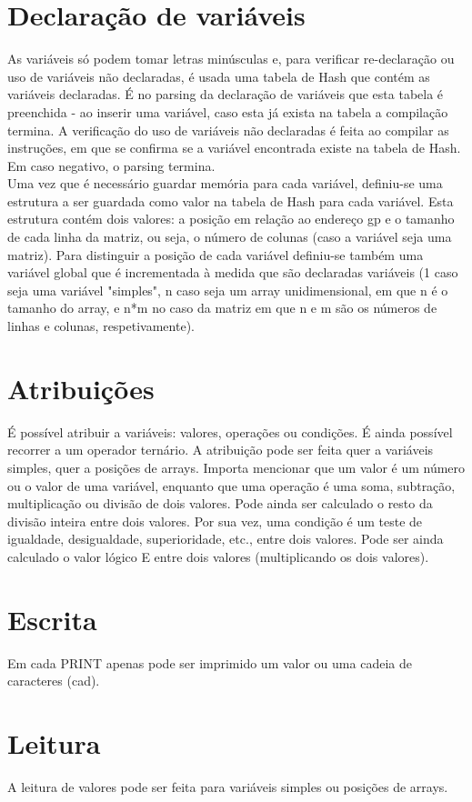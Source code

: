 \documentclass{report}
\begin{document}
\section{Declaração de variáveis}
As variáveis só podem tomar letras minúsculas e, para verificar re-declaração ou uso de variáveis não declaradas, é usada uma tabela de Hash que contém as variáveis declaradas. É no parsing da declaração de variáveis que esta tabela é preenchida - ao inserir uma variável, caso esta já exista na tabela a compilação termina. A verificação do uso de variáveis não declaradas é feita ao compilar as instruções, em que se confirma se a variável encontrada existe na tabela de Hash. Em caso negativo, o parsing termina.\\
Uma vez que é necessário guardar memória para cada variável, definiu-se uma estrutura a ser guardada como valor na tabela de Hash para cada variável. Esta estrutura contém dois valores: a posição em relação ao endereço gp e o tamanho de cada linha da matriz, ou seja, o número de colunas (caso a variável seja uma matriz). Para distinguir a posição de cada variável definiu-se também uma variável global que é incrementada à medida que são declaradas variáveis (1 caso seja uma variável "simples", n caso seja um array unidimensional, em que n é o tamanho do array, e n*m no caso da matriz em que n e m são os números de linhas e colunas, respetivamente).
\section{Atribuições}
É possível atribuir a variáveis: valores, operações ou condições. É ainda possível recorrer a um operador ternário. A atribuição pode ser feita quer a variáveis simples, quer a posições de arrays. Importa mencionar que um valor é um número ou o valor de uma variável, enquanto que uma operação é uma soma, subtração, multiplicação ou divisão de dois valores. Pode ainda ser calculado o resto da divisão inteira entre dois valores. Por sua vez, uma condição é um teste de igualdade, desigualdade, superioridade, etc., entre dois valores. Pode ser ainda calculado o valor lógico E entre dois valores (multiplicando os dois valores).
\section{Escrita}
Em cada PRINT apenas pode ser imprimido um valor ou uma cadeia de caracteres (cad).
\section{Leitura}
A leitura de valores pode ser feita para variáveis simples ou posições de arrays.
\end{document}
